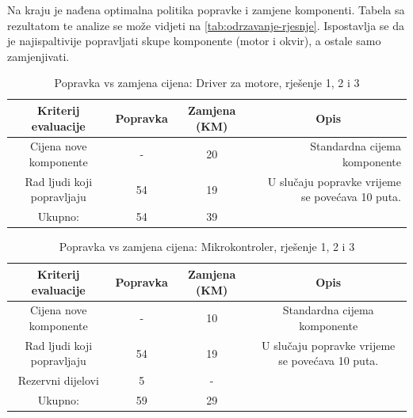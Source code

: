 \documentclass[12pt]{article}
\begin{document}
Na kraju je nađena optimalna politika popravke i zamjene komponenti. Tabela sa rezultatom te analize se može vidjeti na \ref{tab:odrzavanje-rjesnje}. Ispostavlja se da je najispaltivije popravljati skupe komponente (motor i okvir), a ostale samo zamjenjivati.
\begin{landscape}
\vspace*{\fill}
\begin{table}[htbp]
\footnotesize
  \centering
  \caption{Popravka vs zamjena cijena: Driver za motore, rješenje 1, 2 i 3}
    \begin{tabular}{cccr}
    \toprule
    Kriterij evaluacije & Popravka & Zamjena (KM) & \multicolumn{1}{c}{Opis} \\
    \midrule
     Cijena nove komponente & -     & 20    & \multicolumn{1}{p{19.57em}}{Standardna \newline{}cijema\newline{} komponente} \\
    \midrule
    Rad ljudi koji popravljaju & 54    & 19    & \multicolumn{1}{p{19.57em}}{ U slučaju popravke vrijeme se povećava 10 puta. } \\
    \midrule
    Ukupno: & 54    & 39    &  \\
    \bottomrule
    \end{tabular}%
  \label{tab:popravka1}%
\end{table}%

\begin{table}[htbp]
  \centering
\footnotesize
  \caption{Popravka vs zamjena cijena: Mikrokontroler, rješenje 1, 2 i 3}
    \begin{tabular}{cccc}
    \toprule
    Kriterij evaluacije & Popravka & Zamjena (KM) & Opis \\
    \midrule
     Cijena nove komponente & -     & 10    & \multicolumn{1}{p{19.57em}}{Standardna \newline{}cijema\newline{} komponente} \\
    \midrule
    Rad ljudi koji popravljaju & 54    & 19    & \multicolumn{1}{p{19.57em}}{ U slučaju popravke vrijeme se povećava 10 puta. } \\
    \midrule
    Rezervni dijelovi & 5     & -     &  \\
    \midrule
    Ukupno: & 59    & 29    &  \\
    \bottomrule
    \end{tabular}%
  \label{tab:popravka2}%
\end{table}%
\vspace*{\fill}
\end{landscape}
\end{document}
